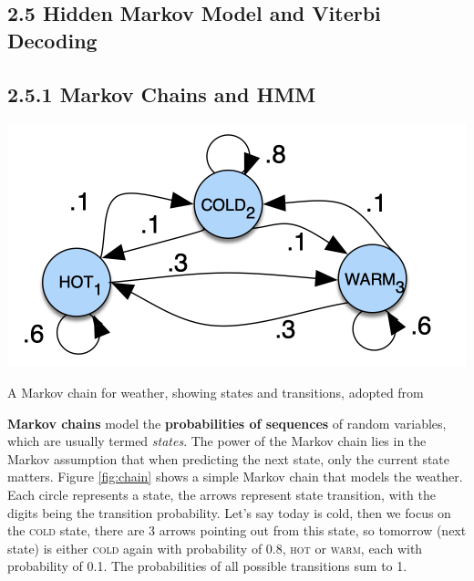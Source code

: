 \documentclass[nobib]{tufte-handout}
\begin{document}
\subsection{2.5 \textbf{Hidden Markov Model and Viterbi Decoding}}

\subsection{2.5.1 \textbf{Markov Chains and HMM}}

\begin{marginfigure}
 \includegraphics[width=1\textwidth]{chain.png}
  \caption{A Markov chain for weather, showing states and transitions, adopted from \cite{slp}}
  \label{fig:chain}
\end{marginfigure}

\textbf{Markov chains} model the \textbf{probabilities of sequences} of random variables, which are usually termed \textit{states}. The power of the Markov chain lies in the Markov assumption that when predicting the next state, only the current state matters. Figure \ref{fig:chain} shows a simple Markov chain that models the weather. Each circle represents a state, the arrows represent state transition, with the digits being the transition probability. Let's say today is cold, then we focus on the \textsc{cold} state, there are 3 arrows pointing out from this state, so tomorrow (next state) is either \textsc{cold} again with probability of 0.8, \textsc{hot} or \textsc{warm}, each with probability of 0.1. The probabilities of all possible transitions sum to 1.\\
\end{document}
